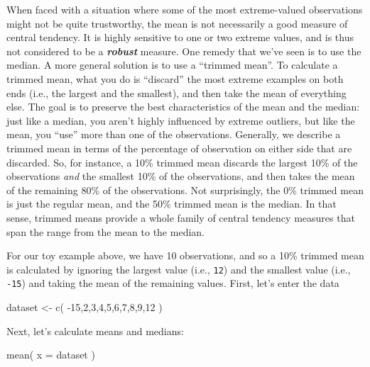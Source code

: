 \documentclass[
]{book}
\newenvironment{Shaded}{\begin{snugshade}}{\end{snugshade}}
\newcommand{\AttributeTok}[1]{\textcolor[rgb]{0.77,0.63,0.00}{#1}}
\newcommand{\DecValTok}[1]{\textcolor[rgb]{0.00,0.00,0.81}{#1}}
\newcommand{\FunctionTok}[1]{\textcolor[rgb]{0.00,0.00,0.00}{#1}}
\newcommand{\NormalTok}[1]{#1}
\newcommand{\OtherTok}[1]{\textcolor[rgb]{0.56,0.35,0.01}{#1}}
\newcommand{\SpecialCharTok}[1]{\textcolor[rgb]{0.00,0.00,0.00}{#1}}
\begin{document}
When faced with a situation where some of the most extreme-valued observations might not be quite trustworthy, the mean is not necessarily a good measure of central tendency. It is highly sensitive to one or two extreme values, and is thus not considered to be a \textbf{\emph{robust}} measure. One remedy that we've seen is to use the median. A more general solution is to use a ``trimmed mean''. To calculate a trimmed mean, what you do is ``discard'' the most extreme examples on both ends (i.e., the largest and the smallest), and then take the mean of everything else. The goal is to preserve the best characteristics of the mean and the median: just like a median, you aren't highly influenced by extreme outliers, but like the mean, you ``use'' more than one of the observations. Generally, we describe a trimmed mean in terms of the percentage of observation on either side that are discarded. So, for instance, a 10\% trimmed mean discards the largest 10\% of the observations \emph{and} the smallest 10\% of the observations, and then takes the mean of the remaining 80\% of the observations. Not surprisingly, the 0\% trimmed mean is just the regular mean, and the 50\% trimmed mean is the median. In that sense, trimmed means provide a whole family of central tendency measures that span the range from the mean to the median.

For our toy example above, we have 10 observations, and so a 10\% trimmed mean is calculated by ignoring the largest value (i.e., \texttt{12}) and the smallest value (i.e., \texttt{-15}) and taking the mean of the remaining values. First, let's enter the data

\begin{Shaded}
\begin{Highlighting}[]
\NormalTok{dataset }\OtherTok{\textless{}{-}} \FunctionTok{c}\NormalTok{( }\SpecialCharTok{{-}}\DecValTok{15}\NormalTok{,}\DecValTok{2}\NormalTok{,}\DecValTok{3}\NormalTok{,}\DecValTok{4}\NormalTok{,}\DecValTok{5}\NormalTok{,}\DecValTok{6}\NormalTok{,}\DecValTok{7}\NormalTok{,}\DecValTok{8}\NormalTok{,}\DecValTok{9}\NormalTok{,}\DecValTok{12}\NormalTok{ )}
\end{Highlighting}
\end{Shaded}

Next, let's calculate means and medians:

\begin{Shaded}
\begin{Highlighting}[]
\FunctionTok{mean}\NormalTok{( }\AttributeTok{x =}\NormalTok{ dataset )}
\end{Highlighting}
\end{Shaded}
\end{document}
